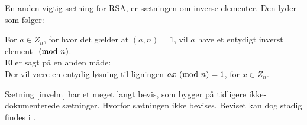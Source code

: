 En anden vigtig sætning for RSA, er sætningen om inverse elementer. Den lyder som følger:

\begin{sent}
    \label{invelm}
    For \(a \in Z_n\), for hvor det gælder at \((a, n) = 1\), vil \(a\) have et entydigt inverst element \(\ (\mathrm{mod}\ n)\).\cite[93]{krypto}\\
    Eller sagt på en anden måde:\\
    Der vil være en entydig løsning til ligningen \(a x \ (\mathrm{mod}\ n) = 1\), for \(x \in Z_n\).
\end{sent}

Sætning \ref{invelm} har et meget langt bevis, som bygger på tidligere ikke-dokumenterede sætninger. Hvorfor sætningen ikke bevises. Beviset kan dog stadig findes i \cite[15]{vestergaard}.
